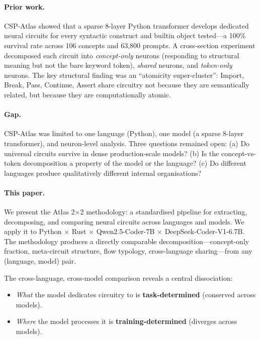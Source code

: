 \documentclass[11pt]{article}
\begin{document}
\paragraph{Prior work.} CSP-Atlas \citep{csp2025} showed that a sparse 8-layer Python transformer develops dedicated neural circuits for every syntactic construct and builtin object tested---a 100\% survival rate across 106 concepts and 63{,}800 prompts. A cross-section experiment decomposed each circuit into \textit{concept-only} neurons (responding to structural meaning but not the bare keyword token), \textit{shared} neurons, and \textit{token-only} neurons. The key structural finding was an ``atomicity super-cluster'': Import, Break, Pass, Continue, Assert share circuitry not because they are semantically related, but because they are computationally atomic.

\paragraph{Gap.} CSP-Atlas was limited to one language (Python), one model (a sparse 8-layer transformer), and neuron-level analysis. Three questions remained open: (a) Do universal circuits survive in dense production-scale models? (b) Is the concept-vs-token decomposition a property of the model or the language? (c) Do different languages produce qualitatively different internal organisations?

\paragraph{This paper.} We present the Atlas 2$\times$2 methodology: a standardised pipeline for extracting, decomposing, and comparing neural circuits across languages and models. We apply it to Python $\times$ Rust $\times$ Qwen2.5-Coder-7B $\times$ DeepSeek-Coder-V1-6.7B. The methodology produces a directly comparable decomposition---concept-only fraction, meta-circuit structure, flow typology, cross-language sharing---from any (language, model) pair.

The cross-language, cross-model comparison reveals a central dissociation:

\begin{itemize}
    \item \textit{What} the model dedicates circuitry to is \textbf{task-determined} (conserved across models).
    \item \textit{Where} the model processes it is \textbf{training-determined} (diverges across models).
\end{itemize}
\end{document}
